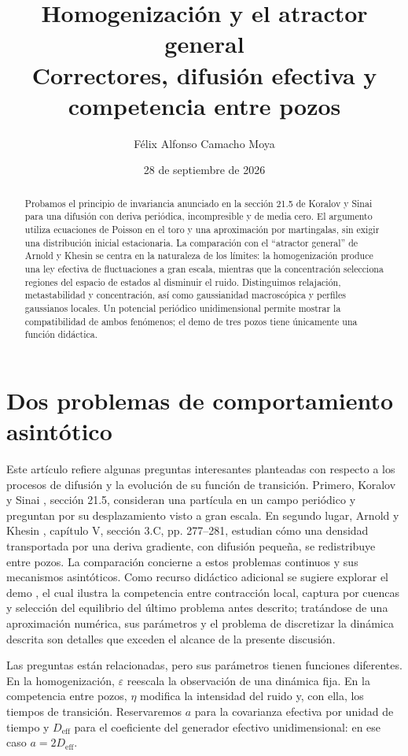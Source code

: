 \documentclass[11pt,a4paper]{article}
\title{Homogenización y el atractor general\\[4pt]\large Correctores, difusión efectiva y competencia entre pozos}
\author{Félix Alfonso Camacho Moya}
\date{28 de septiembre de 2026}
\theoremstyle{remark}\newtheorem{remark}{Observación}
\newcommand{\Deff}{D_{\mathrm{eff}}}
\begin{document}
\maketitle
\begin{abstract}
Probamos el principio de invariancia anunciado en la sección 21.5 de Koralov y Sinai para una difusión con deriva periódica, incompresible y de media cero. El argumento utiliza ecuaciones de Poisson en el toro y una aproximación por martingalas, sin exigir una distribución inicial estacionaria. La comparación con el ``atractor general'' de Arnold y Khesin se centra en la naturaleza de los límites: la homogenización produce una ley efectiva de fluctuaciones a gran escala, mientras que la concentración selecciona regiones del espacio de estados al disminuir el ruido. Distinguimos relajación, metastabilidad y concentración, así como gaussianidad macroscópica y perfiles gaussianos locales. Un potencial periódico unidimensional permite mostrar la compatibilidad de ambos fenómenos; el demo de tres pozos tiene únicamente una función didáctica.
\end{abstract}

\section{Dos problemas de comportamiento asintótico}
Este artículo refiere algunas preguntas interesantes planteadas con respecto a los procesos de difusión y la evolución de su función de transición. Primero, Koralov y Sinai \cite{KS}, sección 21.5, consideran una partícula en un campo periódico y preguntan por su desplazamiento visto a gran escala. En segundo lugar, Arnold y Khesin \cite{AK}, capítulo V, sección 3.C, pp. 277--281, estudian cómo una densidad transportada por una deriva gradiente, con difusión pequeña, se redistribuye entre pozos. La comparación concierne a estos problemas continuos y sus mecanismos asintóticos. Como recurso didáctico adicional se sugiere explorar el demo \cite{demo}, el cual ilustra la competencia entre contracción local, captura por cuencas y selección del equilibrio del último problema antes descrito; tratándose de una aproximación numérica, sus parámetros y el problema de discretizar la dinámica descrita son detalles que exceden el alcance de la presente discusión.

Las preguntas están relacionadas, pero sus parámetros tienen funciones diferentes. En la homogenización, $\varepsilon$ reescala la observación de una dinámica fija. En la competencia entre pozos, $\eta$ modifica la intensidad del ruido y, con ella, los tiempos de transición. Reservaremos $a$ para la covarianza efectiva por unidad de tiempo y $\Deff$ para el coeficiente del generador efectivo unidimensional: en ese caso $a=2\Deff$.
\end{document}
